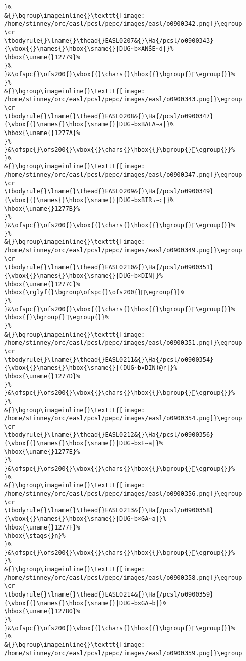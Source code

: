 \begin{verbatim}
}%
&{}\bgroup\imageinline{}\texttt{[image: /home/stinney/orc/easl/pcsl/pepc/images/easl/o0900342.png]}\egroup
\cr
\tbodyrule{}\lname{}\thead{}EASL0207&{}\Ha{/pcsl/o0900343}{\vbox{{}\names{}\hbox{\sname{}|DUG∼b×ANŠE∼d|}%
\hbox{\uname{}12779}%
}%
}&\ofspc{}\ofs200{}\vbox{{}\chars{}\hbox{{}\bgroup{}𒝹\egroup{}}%
}%
&{}\bgroup\imageinline{}\texttt{[image: /home/stinney/orc/easl/pcsl/pepc/images/easl/o0900343.png]}\egroup
\cr
\tbodyrule{}\lname{}\thead{}EASL0208&{}\Ha{/pcsl/o0900347}{\vbox{{}\names{}\hbox{\sname{}|DUG∼b×BALA∼a|}%
\hbox{\uname{}1277A}%
}%
}&\ofspc{}\ofs200{}\vbox{{}\chars{}\hbox{{}\bgroup{}𒝺\egroup{}}%
}%
&{}\bgroup\imageinline{}\texttt{[image: /home/stinney/orc/easl/pcsl/pepc/images/easl/o0900347.png]}\egroup
\cr
\tbodyrule{}\lname{}\thead{}EASL0209&{}\Ha{/pcsl/o0900349}{\vbox{{}\names{}\hbox{\sname{}|DUG∼b×BIR₃∼c|}%
\hbox{\uname{}1277B}%
}%
}&\ofspc{}\ofs200{}\vbox{{}\chars{}\hbox{{}\bgroup{}𒝻\egroup{}}%
}%
&{}\bgroup\imageinline{}\texttt{[image: /home/stinney/orc/easl/pcsl/pepc/images/easl/o0900349.png]}\egroup
\cr
\tbodyrule{}\lname{}\thead{}EASL0210&{}\Ha{/pcsl/o0900351}{\vbox{{}\names{}\hbox{\sname{}|DUG∼b×DIN|}%
\hbox{\uname{}1277C}%
\hbox{\rglyf{}\bgroup\ofspc{}\ofs200{}𒝼\egroup{}}%
}%
}&\ofspc{}\ofs200{}\vbox{{}\chars{}\hbox{{}\bgroup{}𒞯\egroup{}}%
\hbox{{}\bgroup{}𒝼\egroup{}}%
}%
&{}\bgroup\imageinline{}\texttt{[image: /home/stinney/orc/easl/pcsl/pepc/images/easl/o0900351.png]}\egroup
\cr
\tbodyrule{}\lname{}\thead{}EASL0211&{}\Ha{/pcsl/o0900354}{\vbox{{}\names{}\hbox{\sname{}|(DUG∼b×DIN)@r|}%
\hbox{\uname{}1277D}%
}%
}&\ofspc{}\ofs200{}\vbox{{}\chars{}\hbox{{}\bgroup{}𒝽\egroup{}}%
}%
&{}\bgroup\imageinline{}\texttt{[image: /home/stinney/orc/easl/pcsl/pepc/images/easl/o0900354.png]}\egroup
\cr
\tbodyrule{}\lname{}\thead{}EASL0212&{}\Ha{/pcsl/o0900356}{\vbox{{}\names{}\hbox{\sname{}|DUG∼b×E∼a|}%
\hbox{\uname{}1277E}%
}%
}&\ofspc{}\ofs200{}\vbox{{}\chars{}\hbox{{}\bgroup{}𒝾\egroup{}}%
}%
&{}\bgroup\imageinline{}\texttt{[image: /home/stinney/orc/easl/pcsl/pepc/images/easl/o0900356.png]}\egroup
\cr
\tbodyrule{}\lname{}\thead{}EASL0213&{}\Ha{/pcsl/o0900358}{\vbox{{}\names{}\hbox{\sname{}|DUG∼b×GA∼a|}%
\hbox{\uname{}1277F}%
\hbox{\stags{}n}%
}%
}&\ofspc{}\ofs200{}\vbox{{}\chars{}\hbox{{}\bgroup{}𒝿\egroup{}}%
}%
&{}\bgroup\imageinline{}\texttt{[image: /home/stinney/orc/easl/pcsl/pepc/images/easl/o0900358.png]}\egroup
\cr
\tbodyrule{}\lname{}\thead{}EASL0214&{}\Ha{/pcsl/o0900359}{\vbox{{}\names{}\hbox{\sname{}|DUG∼b×GA∼b|}%
\hbox{\uname{}12780}%
}%
}&\ofspc{}\ofs200{}\vbox{{}\chars{}\hbox{{}\bgroup{}𒞀\egroup{}}%
}%
&{}\bgroup\imageinline{}\texttt{[image: /home/stinney/orc/easl/pcsl/pepc/images/easl/o0900359.png]}\egroup

\end{verbatim}
